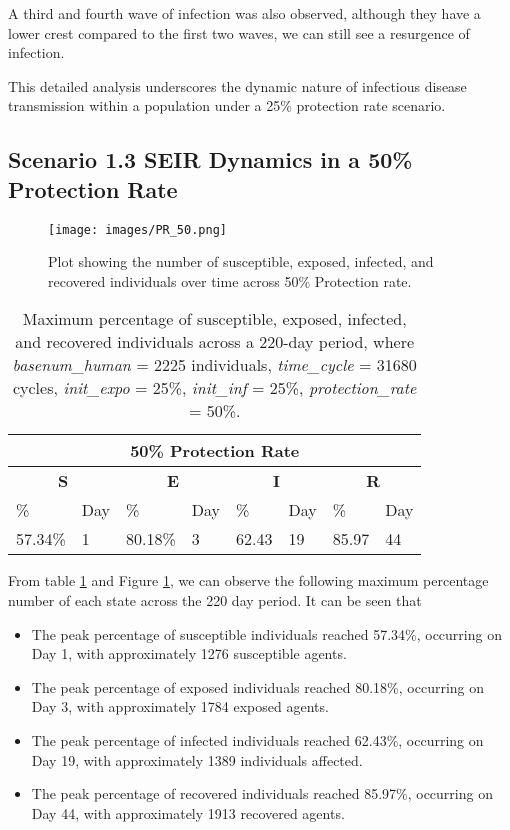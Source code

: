 A third and fourth wave of infection was also observed, although they have a lower crest compared to the first two waves, we can still see a resurgence of infection. 

This detailed analysis underscores the dynamic nature of infectious disease transmission within a population under a 25\% protection rate scenario. 

\subsection{ Scenario 1.3 SEIR Dynamics in a 50\% Protection Rate}

\begin{figure}[H]
	\centering
	\texttt{[image: images/PR\_50.png]}
	\caption{Plot showing the number of susceptible, exposed, infected, and recovered individuals over time across 50\% Protection rate. }
	\label{fig:12}
\end{figure}

\begin{table} [H]
	\centering
	\begin{tabular}{|l|l|l|l|l|l|l|l|}
		
		\hline
		\multicolumn{8}{|c|}{\textbf{50\% Protection Rate}}\\
		\hline
		\multicolumn{2}{|c|}{\textbf{S}} &  \multicolumn{2}{c|}{\textbf{E}}&  \multicolumn{2}{c|}{\textbf{I}}&  \multicolumn{2}{c|}{\textbf{R}}\\
		\hline
		\%& Day & \% & Day & \%  & Day & \% & Day \\
		\hline
		57.34\% & 1 &80.18\%  & 3 &  62.43  & 19 & 85.97  &44\\
		\hline
	\end{tabular}
	\caption{Maximum percentage of susceptible, exposed, infected, and recovered individuals across a 220-day period, where \textit{basenum\_human} = 2225 individuals, \textit{time\_cycle} = 31680 cycles, \textit{init\_expo} = 25\%, \textit{init\_inf} = 25\%,  \textit{protection\_rate} = 50\%.}
	\label{PR3_Max}
\end{table}


From table \ref{PR3_Max} and Figure \ref{fig:12}, we can observe the following maximum percentage number of each state across the 220 day period. It can be seen that 

\begin{itemize}
	\item The peak percentage of susceptible individuals reached 57.34\%, occurring on Day 1, with approximately 1276 susceptible agents.
	\item The peak percentage of exposed individuals reached 80.18\%, occurring on Day 3, with approximately 1784 exposed agents.
	\item The peak percentage of infected individuals reached 62.43\%, occurring on Day 19, with approximately 1389 individuals affected.
	\item The peak percentage of recovered individuals reached 85.97\%, occurring on Day 44, with approximately 1913 recovered agents.
\end{itemize}

